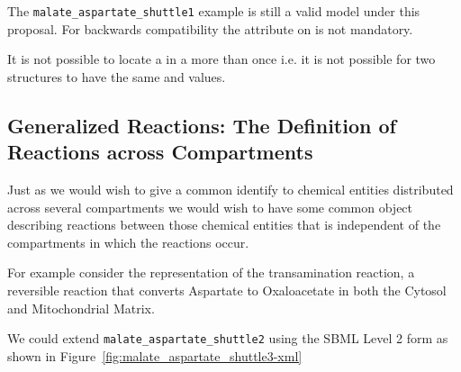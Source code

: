 \documentclass{cekarticle}
\begin{document}
The \texttt{malate\_aspartate\_shuttle1} example is still a valid model under this proposal.
For backwards compatibility the  attribute on  is not
mandatory.

It is not possible to locate a  in a  more than once
i.e. it is not possible for two  structures to have the same
 and  values.

\subsection{Generalized Reactions: The Definition of Reactions across Compartments}
\label{sec:commonreaction}

Just as we would wish to give a common identify to chemical entities distributed across several
compartments we would wish to have some common object describing reactions between those chemical
entities that is independent of the compartments in which the reactions occur.

For example consider the representation of the transamination reaction, a reversible reaction
that converts Aspartate to Oxaloacetate in both the Cytosol and Mitochondrial Matrix.

We could extend \texttt{malate\_aspartate\_shuttle2} using the SBML Level 2 form as shown in
Figure~\ref{fig:malate_aspartate_shuttle3-xml}
\end{document}
